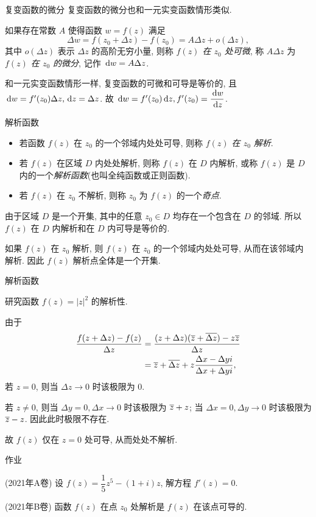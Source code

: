 \begin{frame}{复变函数的微分}
\onslide<+->
复变函数的微分也和一元实变函数情形类似.
\begin{definition}
如果存在常数 $A$ 使得函数 $w=f(z)$ 满足
\[\Delta w=f(z_0+\Delta z)-f(z_0)=A\Delta z+o(\Delta z),\]
其中 $o(\Delta z)$ 表示 $\Delta z$ 的高阶无穷小量,
\onslide<+->
则称 \emph{$f(z)$ 在 $z_0$ 处可微},
\onslide<+->
称 $A\Delta z$ 为 \emph{$f(z)$ 在 $z_0$ 的微分}, 记作 $\,\mathrm{d} w=A \Delta z$.
\end{definition}
\onslide<+->
和一元实变函数情形一样, 复变函数的可微和可导是等价的, 且 $\,\mathrm{d} w=f'(z_0)\Delta z, \,\mathrm{d} z=\Delta z$.
\onslide<+->
故 \emph{$\,\mathrm{d} w=f'(z_0)\,\mathrm{d} z,f'(z_0)=\dfrac{\,\mathrm{d} w}{\,\mathrm{d} z}$}.
\end{frame}


\begin{frame}{解析函数}
\begin{definition}
\begin{itemize}
\item 若函数 $f(z)$ 在 $z_0$ 的一个邻域内处处可导, 则称 \emph{$f(z)$ 在 $z_0$ 解析}.
\item 若 $f(z)$ 在区域 $D$ 内处处解析, 则称 $f(z)$ 在 $D$ 内解析, 或称 $f(z)$ 是 $D$ 内的一个\emph{解析函数}(也叫全纯函数或正则函数).
\item 若 $f(z)$ 在 $z_0$ 不解析, 则称 $z_0$ 为 $f(z)$ 的一个\emph{奇点}.
\end{itemize}
\end{definition}
\onslide<+->
由于区域 $D$ 是一个开集, 其中的任意 $z_0\in D$ 均存在一个包含在 $D$ 的邻域. 
\onslide<+->
所以 \alert{$f(z)$ 在 $D$ 内解析和在 $D$ 内可导是等价的}.

\onslide<+->
如果 $f(z)$ 在 $z_0$ 解析, 则 $f(z)$ 在 $z_0$ 的一个邻域内处处可导, 从而在该邻域内解析.
\onslide<+->
因此 \alert{$f(z)$ 解析点全体是一个开集}.
\end{frame}


\begin{frame}{解析函数}
\begin{example}
研究函数 $f(z)=|z|^2$ 的解析性.
\end{example}
\begin{solution}
\indent
由于
\vspace{-5pt}
\begin{align*}
\frac{f(z+\Delta z)-f(z)}{\Delta z}
&=\frac{(z+\Delta z)(\overline z+\overline{\Delta z})-z\overline z}{\Delta z}\\
&=\overline z+\overline{\Delta z}+z\frac{\Delta x-\Delta yi}{\Delta x+\Delta yi},
\end{align*}
\onslide<+->
若 $z=0$, 则当 $\Delta z\to 0$ 时该极限为 $0$.

\indent
\onslide<+->
若 $z\neq0$, 则当 $\Delta y=0,\Delta x\to 0$ 时该极限为 $\overline z+z$;
\onslide<+->
当 $\Delta x=0,\Delta y\to 0$ 时该极限为 $\overline z-z$.
\onslide<+->
因此此时极限不存在.

\indent
\onslide<+->
故 $f(z)$ 仅在 $z=0$ 处可导, 从而处处不解析.
\end{solution}
\end{frame}


{
\homework
\begin{frame}[<*>]{作业}
  \begin{homeworks}
		\item(2021年A卷) 设 $f(z)=\dfrac15z^5-(1+i)z$, 解方程 $f'(z)=0$.
		\item(2021年B卷) 函数 $f(z)$ 在点 $z_0$ 处解析是 $f(z)$ 在该点可导的\fillbrace.
  \end{homeworks}
\end{frame}
}
